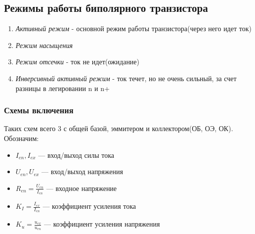 \documentclass[../main.tex]{subfiles}
\begin{document}
\subsection{Режимы работы биполярного транзистора}

\begin{enumerate}
    \item \textit{Активный режим} - основной режим работы транзистора(через него идет ток)
    \item \textit{Режим насыщения}
    \item \textit{Режим отсечки} - ток не идет(ожидание)
    \item \textit{Инверсивный активный режим} - ток течет, но не очень сильный, за счет разницы в легировании n и n+
\end{enumerate}

\subsubsection{Схемы включения}
Таких схем всего 3 с общей базой, эммитером и коллектором(ОБ, ОЭ, ОК). Обозначим:

\begin{itemize}
    \item $I_{en} , I_{ex}$ --- вход/выход силы тока
    \item $U_{en} , U_{ex}$ --- вход/выход напряжения
    \item $R_{en} = \frac{U_{en}}{I_{en}}$ --- входное напряжение
    \item $K_I = \frac{I_{ex}}{I_{en}}$ --- коэффициент усиления тока
    \item $K_u = \frac{u_{ex}}{u_{en}}$ --- коэффициент усиления напряжения
\end{itemize}
\end{document}
